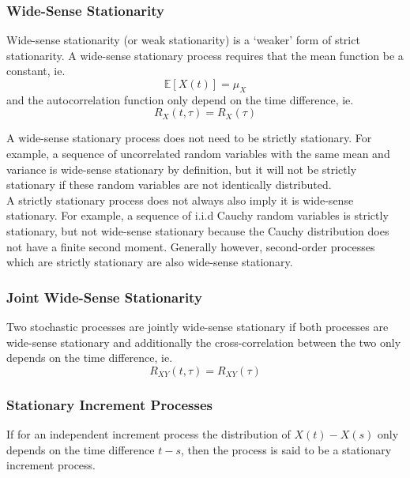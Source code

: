 \documentclass[11pt]{report} %
\begin{document}
\subsubsection{Wide-Sense Stationarity}

Wide-sense stationarity (or weak stationarity) is a `weaker' form of strict stationarity. A wide-sense stationary process requires that the mean function be a constant, ie.
\begin{equation}
\mathbb{E}\left[X\left(t\right)\right] = \mu_{X}
\end{equation}
and the autocorrelation function only depend on the time difference, ie.
\begin{equation}
R_{X}\left(t, \tau\right) = R_{X}\left(\tau\right)
\end{equation}

A wide-sense stationary process does not need to be strictly stationary. For example, a sequence of uncorrelated random variables with the same mean and variance is wide-sense stationary by definition, but it will not be strictly stationary if these random variables are not identically distributed. \\

A strictly stationary process does not always also imply it is wide-sense stationary. For example, a sequence of i.i.d Cauchy random variables is strictly stationary, but not wide-sense stationary because the Cauchy distribution does not have a finite second moment. Generally however, second-order processes which are strictly stationary are also wide-sense stationary.

\subsubsection{Joint Wide-Sense Stationarity}

Two stochastic processes are jointly wide-sense stationary if both processes are wide-sense stationary and additionally the cross-correlation between the two only depends on the time difference, ie.
\begin{equation}
R_{XY}\left(t, \tau\right) = R_{XY}\left(\tau\right)
\end{equation}

\subsubsection{Stationary Increment Processes}

If for an independent increment process the distribution of $X\left(t\right) - X\left(s\right)$ only depends on the time difference $t - s$, then the process is said to be a stationary increment process.
\end{document}

